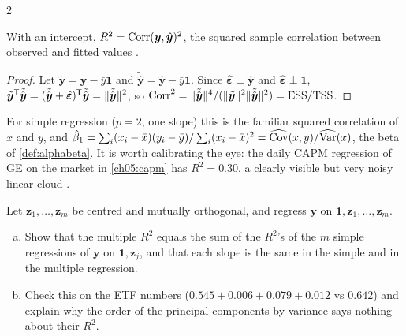 \begin{paracol}{2}
\begin{proposition}\label{ch05:prop-r2corr}
With an intercept, $R^2=\operatorname{Corr}(\bm y,\hat{\bm y})^2$, the squared sample correlation between observed and fitted
values .
\end{proposition}
\begin{proof}
Let $\tilde{\bm y}=\bm y-\bar y\bm 1$ and $\tilde{\hat{\bm y}}=\hat{\bm y}-\bar y\bm 1$. Since $\hat{\bm\varepsilon}\perp\hat{\bm y}$ and
$\hat{\bm\varepsilon}\perp\bm 1$, $\tilde{\bm y}^{\mathsf T}\tilde{\hat{\bm y}}=(\tilde{\hat{\bm y}}+\hat{\bm\varepsilon})^{\mathsf T}\tilde{\hat{\bm y}}=\|\tilde{\hat{\bm y}}\|^2$, so
$\operatorname{Corr}^2=\|\tilde{\hat{\bm y}}\|^4/(\|\tilde{\bm y}\|^2\|\tilde{\hat{\bm y}}\|^2)=\text{ESS}/\text{TSS}$.
\end{proof}
For simple regression ($p=2$, one slope) this is the familiar squared correlation of $x$ and $y$, and
$\hat\beta_1=\sum_i(x_i-\bar x)(y_i-\bar y)/\sum_i(x_i-\bar x)^2=\widehat{\operatorname{Cov}}(x,y)/\widehat{\operatorname{Var}}(x)$, the beta
of \cref{def:alphabeta}. It is worth calibrating the eye: the daily CAPM regression of GE on the market in
\cref{ch05:capm} has $R^2=0.30$, a clearly visible but very noisy linear cloud .

\begin{exercise}\label{ch05:ex-r2orth}
Let $\bm z_1,\dots,\bm z_m$ be centred and mutually orthogonal, and regress $\bm y$ on $\bm 1,\bm z_1,\dots,\bm z_m$.
\begin{enumerate}[(a)]
  \item Show that the multiple
      $R^2$ equals the sum of the $R^2$'s of the $m$ simple regressions of $\bm y$ on $\bm 1,\bm z_j$, and that each slope is the same in the
      simple and in the multiple regression.
  \item Check this on the ETF numbers ($0.545+0.006+0.079+0.012$ vs $0.642$) and
      explain why the order of the principal components by variance says nothing about their $R^2$.
\end{enumerate}
\end{exercise}


\end{paracol}
